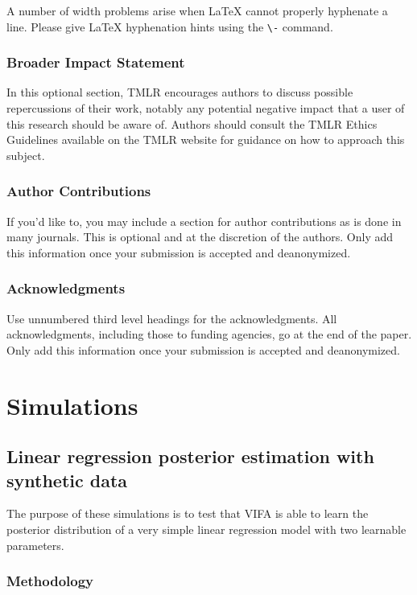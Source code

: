 \documentclass[10pt]{article} %
\begin{document}
A number of width problems arise when LaTeX cannot properly hyphenate a
line. Please give LaTeX hyphenation hints using the \verb+\-+ command.

\subsubsection*{Broader Impact Statement}
In this optional section, TMLR encourages authors to discuss possible repercussions of their work,
notably any potential negative impact that a user of this research should be aware of. 
Authors should consult the TMLR Ethics Guidelines available on the TMLR website
for guidance on how to approach this subject.

\subsubsection*{Author Contributions}
If you'd like to, you may include a section for author contributions as is done
in many journals. This is optional and at the discretion of the authors. Only add
this information once your submission is accepted and deanonymized. 

\subsubsection*{Acknowledgments}
Use unnumbered third level headings for the acknowledgments. All
acknowledgments, including those to funding agencies, go at the end of the paper.
Only add this information once your submission is accepted and deanonymized. 

\section{Simulations}

\subsection{Linear regression posterior estimation with synthetic data}

The purpose of these simulations is to test that VIFA is able to learn the posterior distribution of a very simple linear regression model with two learnable parameters.

\subsubsection{Methodology}\label{sec:linear_regression_synthetic_data_posterior_methodology}
\end{document}
